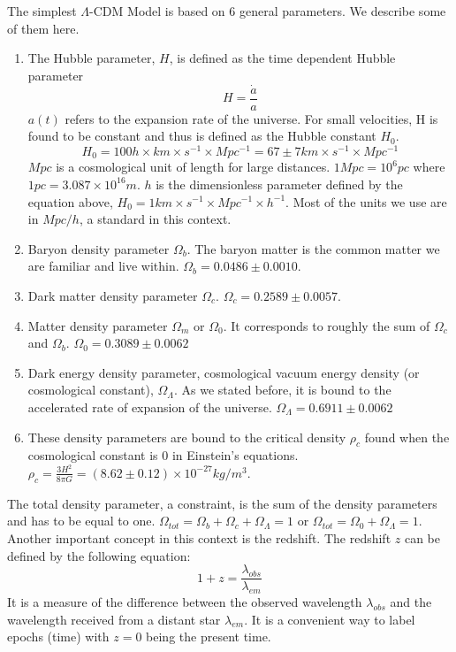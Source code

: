 \documentclass[12pt]{article}
\begin{document}
\begin{par}
The simplest $\Lambda$-CDM Model is based on 6 general parameters. We describe some of them here.\\
\begin{enumerate}
\item The Hubble parameter, $H$, is defined as the time
 dependent Hubble parameter 
\[
H = \frac{\dot{a}}{a}
\]
$a(t)$ refers to the expansion rate of the universe. For
 small velocities, H is found to be constant and thus is
  defined as the Hubble constant $H_0$. 
\[
H_0 = 100 h \times km \times s^{-1} \times Mpc^{-1} = 67 \pm 7 km \times s^{-1} \times Mpc^{-1}
\]
$Mpc$ is a cosmological unit of length for large
 distances. $1 Mpc = 10^6 pc$ where $1 pc = 3.087 \times
  10^{16} m$. $h$ is the dimensionless parameter defined
   by the equation above, $H_0 = 1 km \times s^{-1} \times Mpc^{-1} \times
    h^{-1}$. Most of the units we use are in $Mpc/h$, a
     standard in this context.
\item Baryon density parameter $\Omega_b$. The baryon matter is the common matter we are familiar and live within. $\Omega_b = 0.0486 \pm 0.0010$.

\item Dark matter density parameter $\Omega_c$. $\Omega_c = 0.2589 \pm 0.0057$.

\item Matter density parameter $\Omega_m$ or $\Omega_0$.
 It corresponds to roughly the sum of $\Omega_c$ and
  $\Omega_b$. $\Omega_0 = 0.3089 \pm 0.0062$

\item Dark energy density parameter, cosmological vacuum energy density (or cosmological constant), $\Omega_{\Lambda}$. As we stated before, it is bound to the accelerated rate of expansion of the universe. $\Omega_{\Lambda} = 0.6911 \pm 0.0062$

\item These density parameters are bound to the critical density $\rho_c$ found when the cosmological constant is 0 in Einstein's equations. $\rho_c = \frac{3H^2}{8 \pi G} = (8.62 \pm 0.12) \times 10^{−27} kg/m^3$.

\end{enumerate}
The total density parameter, a constraint, is the sum of
 the density parameters and has to be equal to one. $\Omega_{tot} = \Omega_b + \Omega_c + \Omega_{\Lambda} =1$ or $\Omega_{tot} = \Omega_0 + \Omega_{\Lambda} =1$.\\

Another important concept in this context is the redshift. The redshift $z$ can be defined by the following equation\cite{peebles_cosmological_2003}: 
\[
1 + z = \frac{\lambda_{obs}}{\lambda_{em}}
\] 
It is a measure of the difference between the observed
 wavelength $\lambda_{obs}$ and the wavelength received
  from a distant star $\lambda_{em}$. It is a convenient
   way to label epochs (time) with $z=0$ being the
    present time.
\end{par}
\end{document}

